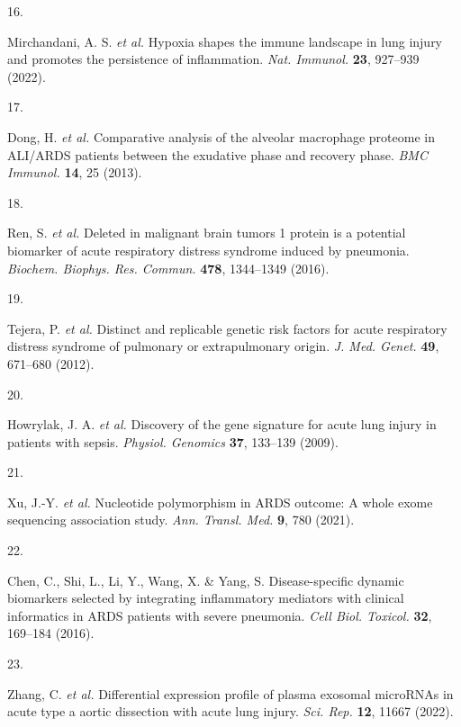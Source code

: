 \documentclass[
  11,
  a4paper,
]{article}
\newlength{\cslhangindent}
\newlength{\csllabelwidth}
\newlength{\cslentryspacingunit} %
\newenvironment{CSLReferences}[2] %
 {%
  \setlength{\parindent}{0pt}
  \ifodd #1
  \let\oldpar\par
  \def\par{\hangindent=\cslhangindent\oldpar}
  \fi
  \setlength{\parskip}{#2\cslentryspacingunit}
 }%
 {}
\newcommand{\CSLLeftMargin}[1]{\parbox[t]{\csllabelwidth}{#1}}
\newcommand{\CSLRightInline}[1]{\parbox[t]{\linewidth - \csllabelwidth}{#1}\break}
\begin{document}
\begin{CSLReferences}{0}{0}
\leavevmode{}%
\CSLLeftMargin{16. }%
\CSLRightInline{Mirchandani, A. S. \emph{et al.} Hypoxia shapes the
immune landscape in lung injury and promotes the persistence of
inflammation. \emph{Nat. Immunol.} \textbf{23}, 927--939 (2022).}

\leavevmode{}%
\CSLLeftMargin{17. }%
\CSLRightInline{Dong, H. \emph{et al.} Comparative analysis of the
alveolar macrophage proteome in {ALI/ARDS} patients between the
exudative phase and recovery phase. \emph{BMC Immunol.} \textbf{14}, 25
(2013).}

\leavevmode{}%
\CSLLeftMargin{18. }%
\CSLRightInline{Ren, S. \emph{et al.} Deleted in malignant brain tumors
1 protein is a potential biomarker of acute respiratory distress
syndrome induced by pneumonia. \emph{Biochem. Biophys. Res. Commun.}
\textbf{478}, 1344--1349 (2016).}

\leavevmode{}%
\CSLLeftMargin{19. }%
\CSLRightInline{Tejera, P. \emph{et al.} Distinct and replicable genetic
risk factors for acute respiratory distress syndrome of pulmonary or
extrapulmonary origin. \emph{J. Med. Genet.} \textbf{49}, 671--680
(2012).}

\leavevmode{}%
\CSLLeftMargin{20. }%
\CSLRightInline{Howrylak, J. A. \emph{et al.} Discovery of the gene
signature for acute lung injury in patients with sepsis. \emph{Physiol.
Genomics} \textbf{37}, 133--139 (2009).}

\leavevmode{}%
\CSLLeftMargin{21. }%
\CSLRightInline{Xu, J.-Y. \emph{et al.} Nucleotide polymorphism in
{ARDS} outcome: A whole exome sequencing association study. \emph{Ann.
Transl. Med.} \textbf{9}, 780 (2021).}

\leavevmode{}%
\CSLLeftMargin{22. }%
\CSLRightInline{Chen, C., Shi, L., Li, Y., Wang, X. \& Yang, S.
Disease-specific dynamic biomarkers selected by integrating inflammatory
mediators with clinical informatics in {ARDS} patients with severe
pneumonia. \emph{Cell Biol. Toxicol.} \textbf{32}, 169--184 (2016).}

\leavevmode{}%
\CSLLeftMargin{23. }%
\CSLRightInline{Zhang, C. \emph{et al.} Differential expression profile
of plasma exosomal {microRNAs} in acute type a aortic dissection with
acute lung injury. \emph{Sci. Rep.} \textbf{12}, 11667 (2022).}


\end{CSLReferences}
\end{document}
